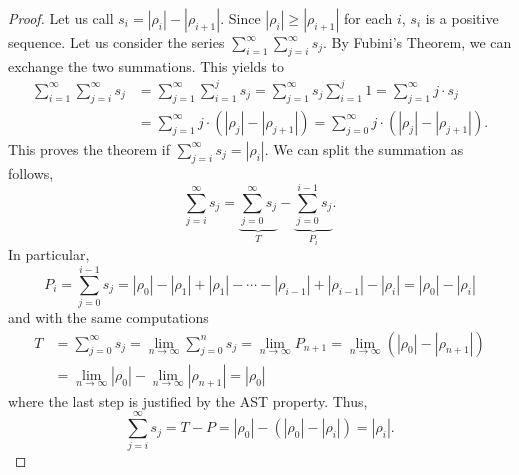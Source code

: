 \begin{LONG}
	\begin{proof}
		Let us call $s_i=\left|\rho_i\right| -\left|\rho_{i+1}\right|$. Since $\left|\rho_i\right|\geq\left|\rho_{i+1}\right|$ for each $i$, $s_i$ is a positive sequence. Let us consider the series $\sum\limits_{i=1}^{\infty} \sum\limits_{j=i}^{\infty} s_j$.
		By Fubini's Theorem, we can exchange the two summations. This yields to
		\begin{align*}
		\sum\limits_{i=1}^{\infty} \sum\limits_{j=i}^{\infty} s_j &= \sum\limits_{j=1}^{\infty} \sum\limits_{i=1}^{j} s_j = \sum\limits_{j=1}^{\infty} s_j\sum\limits_{i=1}^{j} 1= \sum\limits_{j=1}^{\infty} j\cdot s_j\\
		&= \sum\limits_{j=1}^{\infty} j\cdot (\left|\rho_j\right| -\left|\rho_{j+1}\right|) = \sum\limits_{j=0}^{\infty} j\cdot (\left|\rho_j\right| -\left|\rho_{j+1}\right|).
		\end{align*}
		This proves the theorem if $\sum\limits_{j=i}^{\infty} s_j=\left|\rho_i\right|$. We can split the summation as follows,
		$$
		\sum\limits_{j=i}^{\infty} s_j = \underbrace{\sum\limits_{j=0}^{\infty} s_j}_T - \underbrace{\sum\limits_{j=0}^{i-1} s_j}_{P_i}.
		$$
		In particular,
		$$
		P_i = \sum\limits_{j=0}^{i-1} s_j = \left|\rho_0\right| -\left|\rho_{1}\right| + \left|\rho_{1}\right| - \cdots - \left|\rho_{i-1}\right| + \left|\rho_{i-1}\right| - \left|\rho_{i}\right|=\left|\rho_0\right| -\left|\rho_{i}\right|
		$$
		and with the same computations
		\begin{align*}
		T&=\sum\limits_{j=0}^{\infty} s_j = \underset{n\rightarrow\infty}{\lim}\sum\limits_{j=0}^{n} s_j = \underset{n\rightarrow\infty}{\lim} P_{n+1} = \underset{n\rightarrow\infty}{\lim} (\left|\rho_0\right| -\left|\rho_{n+1}\right|)\\
		&= \underset{n\rightarrow\infty}{\lim}|\rho_0|-\underset{n\rightarrow\infty}{\lim} |\rho_{n+1}| = \left|\rho_0\right|
		\end{align*}
		where the last step is justified by the AST property.
		Thus,
		$$
		\sum\limits_{j=i}^{\infty} s_j = T - P = \left|\rho_0\right| - (\left|\rho_0\right| -\left|\rho_{i}\right|) = \left|\rho_{i}\right|.
		$$
	\end{proof}
\end{LONG}
